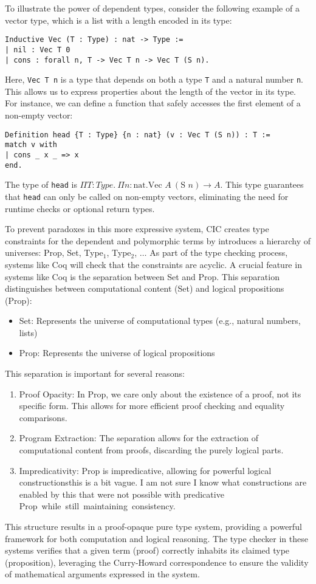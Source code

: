 To illustrate the power of dependent types, consider the following example of a vector type, which is a list with a length encoded in its type:
\begin{verbatim}
Inductive Vec (T : Type) : nat -> Type :=
| nil : Vec T 0
| cons : forall n, T -> Vec T n -> Vec T (S n).
\end{verbatim}
Here, \texttt{Vec T n} is a type that depends on both a type \texttt{T} and a natural number \texttt{n}. 
This allows us to express properties about the length of the vector in its type. 
For instance, we can define a function that safely accesses the first element of a non-empty vector:
\begin{verbatim}
Definition head {T : Type} {n : nat} (v : Vec T (S n)) : T :=
match v with
| cons _ x _ => x
end.
\end{verbatim}
The type of \texttt{head} is $\Pi T:Type.~\Pi n:\text{nat}. \text{Vec } A~(\text{S } n) \to A$. 
This type guarantees that \texttt{head} can only be called on non-empty vectors, eliminating the need for runtime checks or optional return types.

To prevent paradoxes in this more expressive system, CIC creates type constraints for the dependent and polymorphic terms by introduces a hierarchy of universes: Prop, Set, Type$_1$, Type$_2$, $\ldots$
As part of the type checking process, systems like Coq will check that the constraints are acyclic.
A crucial feature in systems like Coq is the separation between Set and Prop. 
This separation distinguishes between computational content (Set) and logical propositions (Prop):
\begin{itemize}
\item Set: Represents the universe of computational types (e.g., natural numbers, lists)
\item Prop: Represents the universe of logical propositions
\end{itemize}
This separation is important for several reasons:
\begin{enumerate}
\item Proof Opacity: In Prop, we care only about the existence of a proof, not its specific form. 
This allows for more efficient proof checking and equality comparisons.
\item Program Extraction: The separation allows for the extraction of computational content from proofs, discarding the purely logical parts.
\item Impredicativity: Prop is impredicative, allowing for powerful logical constructions\SI{this is a bit vague. I am not sure I know what constructions are enabled by this that were not possible with predicative Prop} while still maintaining consistency.
\end{enumerate}
This structure results in a proof-opaque pure type system, providing a powerful framework for both computation and logical reasoning. 
The type checker in these systems verifies that a given term (proof) correctly inhabits its claimed type (proposition), leveraging the Curry-Howard correspondence to ensure the validity of mathematical arguments expressed in the system.


